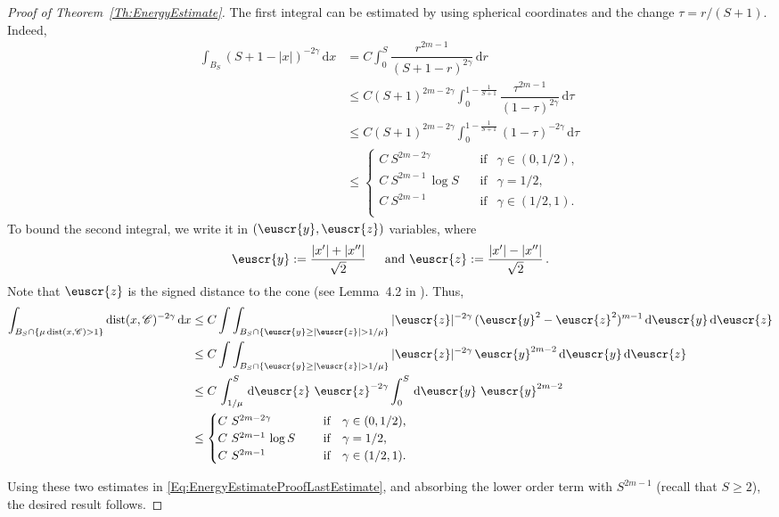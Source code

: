 \documentclass[12pt,reqno]{amsart}
\theoremstyle{definition}
\theoremstyle{remark}
\newcommand{\ccal}{\mathscr{C}}
\newcommand{\s}{\gamma}
\renewcommand{\d}{\,\mathrm{d}} %
\DeclareMathOperator{\dist}{dist}
\numberwithin{equation}{section}
\begin{document}
\begin{proof}[Proof of Theorem~\ref{Th:EnergyEstimate}]
	
	The first integral can be estimated by using spherical coordinates and the change $\tau = r/(S+1)$. Indeed,
	\begin{align*}
	\int_{B_S} \left( S+1-|x| \right)^{-2\s} \d x & = C \int_0^S \dfrac{r^{2m-1}}{(S+1-r)^{2\s}} \d r \\
	& \leq C (S+1)^{2m - 2\s}\int_0^{1 - \frac{1}{S+1}} \dfrac{\tau^{2m-1}}{(1-\tau)^{2\s}} \d \tau\\
	&\leq C (S+1)^{2m - 2\s}\int_0^{1 - \frac{1}{S+1}} (1-\tau)^{-2\s} \d \tau \\
	& \leq \begin{cases}
	C \ S^{2m-2\s}\ \ \ \ &\textrm{if } \ \ \s\in(0,1/2),\\
	C\ S^{2m-1}\,\log S\ \ \ \ &\textrm{if } \ \ \s=1/2,\\
	C \ S^{2m-1}\ \ \ \ &\textrm{if } \ \ \s\in(1/2,1).\\
	\end{cases}
	\end{align*}
	To bound the second integral, we write it in $(\euscr{y},\euscr{z})$ variables, where
	$$
	\euscr{y} := \dfrac{|x'|+|x''|}{\sqrt{2}} \, \quad \text{ and } \euscr{z} := \dfrac{|x'|-|x''|}{\sqrt{2}}\,.
	$$
	Note that $\euscr{z}$ is the signed distance to the cone (see Lemma~4.2 in \cite{CabreTerraI}). Thus,
	\begin{align*}
	\int_{B_{S}\cap \{\mu \dist(x,\ccal)>1\}} \dist(x,\ccal)^{-2\s} \d x &\leq C \int \int_{B_{S}\cap \{\euscr{y}\geq|\euscr{z}|>1/\mu\}} |\euscr{z}|^{-2\s} \, (\euscr{y}^2-\euscr{z}^2)^{m-1} \d \euscr{y}\d \euscr{z} \\
	& \leq C \int \int_{B_{S}\cap \{\euscr{y}\geq|\euscr{z}|>1/\mu\}} |\euscr{z}|^{-2\s} \, \euscr{y}^{2m-2} \d \euscr{y}\d \euscr{z} \\
	& \leq C\, \int_{1/\mu}^S \d \euscr{z}   \ \euscr{z}^{-2\s}\int_0^S \d \euscr{y}\  \euscr{y}^{2m-2} \\
	& \leq \begin{cases}
	C \ S^{2m-2\s}\ \ \ \ &\textrm{if } \ \ \s\in(0,1/2),\\
	C\ S^{2m-1}\,\log S\ \ \ \ &\textrm{if } \ \ \s=1/2,\\
	C \ S^{2m-1}\ \ \ \ &\textrm{if } \ \ \s\in(1/2,1).\\
	\end{cases}
	\end{align*}
	
	Using these two estimates in \eqref{Eq:EnergyEstimateProofLastEstimate}, and absorbing the lower order term with $S^{2m-1}$ (recall that $S\geq 2$), the desired result follows.
\end{proof}
\end{document}
